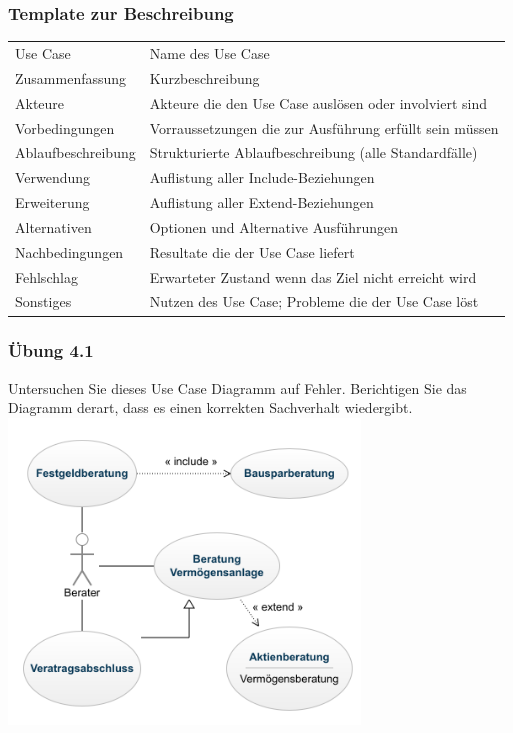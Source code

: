 \begin{frame}
\frametitle{Template zur Beschreibung}
	\scriptsize
	\begin{table}[]
		\begin{tabular}{l|l}
		 Use Case 				  & Name des Use Case\\
		 Zusammenfassung 		& Kurzbeschreibung\\
		 Akteure 				    & Akteure die den Use Case auslösen oder involviert sind\\
		 Vorbedingungen 		& Vorraussetzungen die zur Ausführung erfüllt sein müssen\\
		 Ablaufbeschreibung & Strukturierte Ablaufbeschreibung (alle Standardfälle)\\
		 Verwendung 				& Auflistung aller Include-Beziehungen\\
		 Erweiterung 				& Auflistung aller Extend-Beziehungen\\
		 Alternativen 			& Optionen und Alternative Ausführungen\\
		 Nachbedingungen 	  & Resultate die der Use Case liefert\\
		 Fehlschlag 				& Erwarteter Zustand wenn das Ziel nicht erreicht wird\\
		 Sonstiges 				  & Nutzen des Use Case; Probleme die der Use Case löst\\
		\end{tabular}
	\end{table}
\end{frame}

\begin{frame}
\frametitle{Übung 4.1}
	Untersuchen Sie dieses Use Case Diagramm auf Fehler. Berichtigen Sie das Diagramm derart,
	dass es einen korrekten Sachverhalt wiedergibt.
	\bigskip
	\center
	\includegraphics[width=0.7\textwidth,
	keepaspectratio=true]{bilder/use_case_aufg1.png}
\end{frame}

